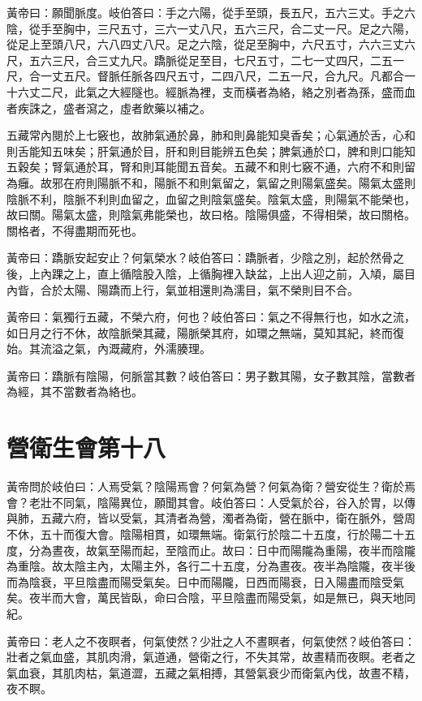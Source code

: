 黃帝曰：願聞脈度。岐伯答曰：手之六陽，從手至頭，長五尺，五六三丈。手之六陰，從手至胸中，三尺五寸，三六一丈八尺，五六三尺，合二丈一尺。足之六陽，從足上至頭八尺，六八四丈八尺。足之六陰，從足至胸中，六尺五寸，六六三丈六尺，五六三尺，合三丈九尺。蹻脈從足至目，七尺五寸，二七一丈四尺，二五一尺，合一丈五尺。督脈任脈各四尺五寸，二四八尺，二五一尺，合九尺。凡都合一十六丈二尺，此氣之大經隧也。經脈為裡，支而橫者為絡，絡之別者為孫，盛而血者疾誅之，盛者瀉之，虛者飲藥以補之。

五藏常內閱於上七竅也，故肺氣通於鼻，肺和則鼻能知臭香矣；心氣通於舌，心和則舌能知五味矣；肝氣通於目，肝和則目能辨五色矣；脾氣通於口，脾和則口能知五穀矣；腎氣通於耳，腎和則耳能聞五音矣。五藏不和則七竅不通，六府不和則留為癰。故邪在府則陽脈不和，陽脈不和則氣留之，氣留之則陽氣盛矣。陽氣太盛則陰脈不利，陰脈不利則血留之，血留之則陰氣盛矣。陰氣太盛，則陽氣不能榮也，故曰關。陽氣太盛，則陰氣弗能榮也，故曰格。陰陽俱盛，不得相榮，故曰關格。關格者，不得盡期而死也。

黃帝曰：蹻脈安起安止？何氣榮水？岐伯答曰：蹻脈者，少陰之別，起於然骨之後，上內踝之上，直上循陰股入陰，上循胸裡入缺盆，上出人迎之前，入頄，屬目內眥，合於太陽、陽蹻而上行，氣並相還則為濡目，氣不榮則目不合。

黃帝曰：氣獨行五藏，不榮六府，何也？岐伯答曰：氣之不得無行也，如水之流，如日月之行不休，故陰脈榮其藏，陽脈榮其府，如環之無端，莫知其紀，終而復始。其流溢之氣，內溉藏府，外濡腠理。

黃帝曰：蹻脈有陰陽，何脈當其數？岐伯答曰：男子數其陽，女子數其陰，當數者為經，其不當數者為絡也。




\section{營衛生會第十八}

黃帝問於岐伯曰：人焉受氣？陰陽焉會？何氣為營？何氣為衛？營安從生？衛於焉會？老壯不同氣，陰陽異位，願聞其會。岐伯答曰：人受氣於谷，谷入於胃，以傳與肺，五藏六府，皆以受氣，其清者為營，濁者為衛，營在脈中，衛在脈外，營周不休，五十而復大會。陰陽相貫，如環無端。衛氣行於陰二十五度，行於陽二十五度，分為晝夜，故氣至陽而起，至陰而止。故曰：日中而陽隴為重陽，夜半而陰隴為重陰。故太陰主內，太陽主外，各行二十五度，分為晝夜。夜半為陰隴，夜半後而為陰衰，平旦陰盡而陽受氣矣。日中而陽隴，日西而陽衰，日入陽盡而陰受氣矣。夜半而大會，萬民皆臥，命曰合陰，平旦陰盡而陽受氣，如是無已，與天地同紀。

黃帝曰：老人之不夜瞑者，何氣使然？少壯之人不晝瞑者，何氣使然？岐伯答曰：壯者之氣血盛，其肌肉滑，氣道通，營衛之行，不失其常，故晝精而夜瞑。老者之氣血衰，其肌肉枯，氣道澀，五藏之氣相搏，其營氣衰少而衛氣內伐，故晝不精，夜不瞑。

